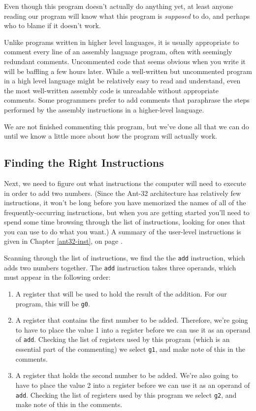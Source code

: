 Even though this program doesn't actually do anything yet, at least
anyone reading our program will know what this program is {\em
supposed} to do, and perhaps who to blame if it doesn't work.

Unlike programs written in higher level languages, it is usually
appropriate to comment every line of an assembly language program,
often with seemingly redundant comments.  Uncommented code that seems
obvious when you write it will be baffling a few hours later.  While a
well-written but uncommented program in a high level language might be
relatively easy to read and understand, even the most well-written
assembly code is unreadable without appropriate comments.  Some
programmers prefer to add comments that paraphrase the steps performed
by the assembly instructions in a higher-level language.

We are not finished commenting this program, but we've done all that
we can do until we know a little more about how the program will
actually work.

\subsection{Finding the Right Instructions}

Next, we need to figure out what instructions the computer will need
to execute in order to add two numbers.  (Since the Ant-32
architecture has relatively few instructions, it won't be long before
you have memorized the names of all of the frequently-occurring
instructions, but when you are getting started you'll need to spend
some time browsing through the list of instructions, looking for ones
that you can use to do what you want.) A summary of the user-level
instructions is given in Chapter \ref{ant32-inst}, on page
\pageref{ant32-inst}.

Scanning through the list of instructions, we find the the {\tt add}
instruction, which adds two numbers together.
The {\tt add} instruction takes three operands, which must appear
in the following order:

\begin{enumerate}

\item A register that will be used to hold the result of the addition. 
	For our program, this will be {\tt g0}.

\item A register that contains the first number to be added. 
	Therefore, we're going to have to place the value 1 into a
	register before we can use it as an operand of {\tt add}. 
	Checking the list of registers used by this program (which is
	an essential part of the commenting) we select {\tt g1}, and
	make note of this in the comments.

\item A register that holds the second number to be added.  We're also
	going to have to place the value 2 into a register before we
	can use it as an operand of {\tt add}.  Checking the list of
	registers used by this program we select {\tt g2}, and make
	note of this in the comments.

\end{enumerate}

